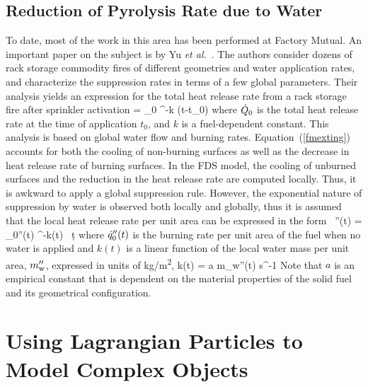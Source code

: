 \subsection{Reduction of Pyrolysis Rate due to Water}

To date, most of the work in this area has been performed at Factory Mutual. An important paper on the subject is by Yu {\em et al.}~\cite{Yu:1}. The authors consider dozens of rack storage commodity fires of different geometries and water application rates, and characterize the suppression rates in terms of a few global parameters. Their analysis yields an expression for the total heat release rate from a rack storage fire after sprinkler activation
\be
   \dQ = \dQ_0 \; ^{-k (t-t_0)}  \label{fmexting}
\ee
where $\dot{Q}_0$ is the total heat release rate at the time of application $t_0$, and $k$ is a fuel-dependent constant. This analysis is based on global water flow and burning rates. Equation~(\ref{fmexting}) accounts for both the cooling of non-burning surfaces as well as the decrease in heat release rate of burning surfaces. In the FDS model, the cooling of unburned surfaces and the reduction in the heat release rate are computed locally. Thus, it is awkward to apply a global suppression rule. However, the exponential nature of suppression by water is observed both locally and globally, thus it is assumed that the local heat release rate per unit area can be expressed in the form~\cite{Hamins:1,Hamins:IAFSS2002}
\be
   \dq''(t) = \dq_0''(t) \; ^{-\int k(t) \, \d t}
\label{nistexting} \ee
where $\dot{q}_0''(t)$ is the burning rate per unit area of the fuel when no water is applied and $k(t)$ is a linear function of the local water mass per unit area, $m_{\rm w}''$, expressed in units of \unit{kg/m^2},
\be
   k(t) = a \; m_{\rm w}''(t) \quad   \hbox{s}^{-1}
\ee
Note that $a$ is an empirical constant that is dependent on the material properties of the solid fuel and its geometrical configuration.



\section{Using Lagrangian Particles to Model Complex Objects}
\label{rad_part_absorb}

